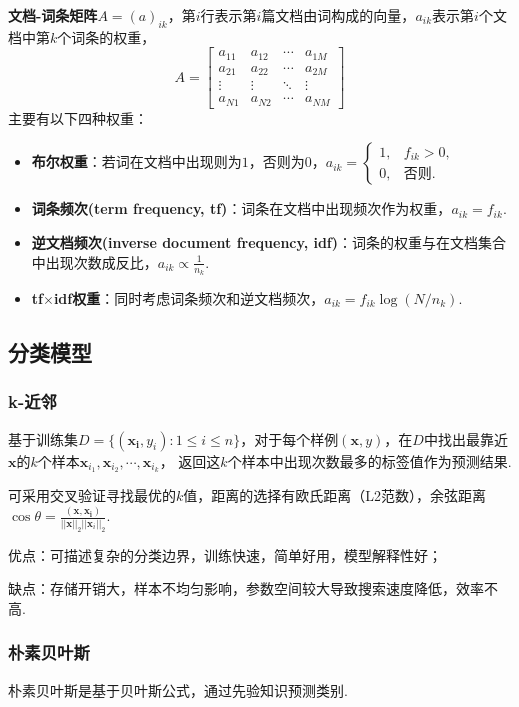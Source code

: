 \documentclass[12pt, a4paper, oneside]{ctexart}
\numberwithin{equation}{section}  %
\let\leq=\leqslant %
\def\bd{\boldsymbol}        %
\begin{document}
\textbf{文档-词条矩阵}$A = (a)_{ik}$，第$i$行表示第$i$篇文档由词构成的向量，$a_{ik}$表示第$i$个文档中第$k$个词条的权重，
\begin{equation*}
    A = \left[\begin{matrix}
        a_{11}&a_{12}&\cdots&a_{1M}\\
        a_{21}&a_{22}&\cdots&a_{2M}\\
        \vdots&\vdots&\ddots&\vdots\\
        a_{N1}&a_{N2}&\cdots&a_{NM}
    \end{matrix}\right]
\end{equation*}
主要有以下四种权重：
\begin{itemize}
    \item \textbf{布尔权重}：若词在文档中出现则为$1$，否则为$0$，$a_{ik} = \begin{cases}
        1,&f_{ik} > 0,\\
        0,&\text{否则}.
    \end{cases}$
    \item \textbf{词条频次(term frequency, tf)}：词条在文档中出现频次作为权重，$a_{ik} = f_{ik}$.
    \item \textbf{逆文档频次(inverse document frequency, idf)}：词条的权重与在文档集合中出现次数成反比，$a_{ik}\propto \frac{1}{n_k}$.
    \item \textbf{tf$\times$idf权重}：同时考虑词条频次和逆文档频次，$a_{ik} = f_{ik}\log\left(N/n_k\right)$.
\end{itemize}
\subsection{分类模型}
\subsubsection{k-近邻}
基于训练集$D=\{(\bd{x_i},y_i):1\leq i\leq n\}$，对于每个样例$(\bd{x},y)$，在$D$中找出最靠近$\bd{x}$的$k$个样本$\bd{x}_{i_1},\bd{x}_{i_2},\cdots,\bd{x}_{i_k}$，
返回这$k$个样本中出现次数最多的标签值作为预测结果.

可采用交叉验证寻找最优的$k$值，距离的选择有欧氏距离（L2范数），余弦距离$\cos\theta = \frac{(\bd{x},\bd{x_i})}{||\bd{x}||_2||\bd{x}_i||_2}$.

优点：可描述复杂的分类边界，训练快速，简单好用，模型解释性好；

缺点：存储开销大，样本不均匀影响，参数空间较大导致搜索速度降低，效率不高.

\subsubsection{朴素贝叶斯}
朴素贝叶斯是基于贝叶斯公式，通过先验知识预测类别.
\end{document}
